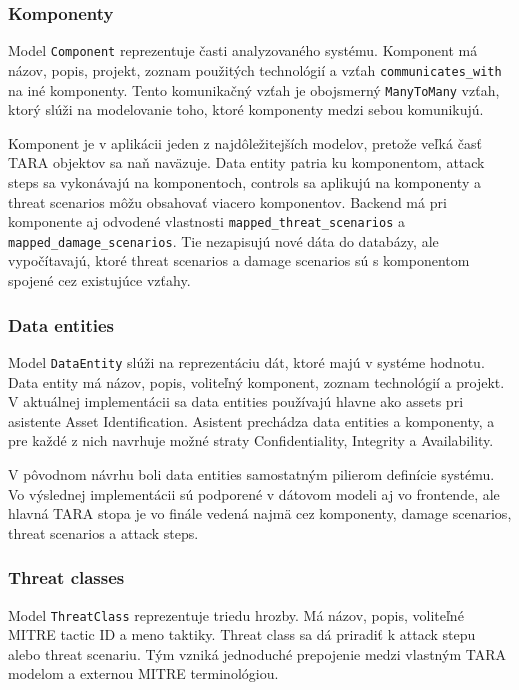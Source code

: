 \documentclass[11pt]{article}
\begin{document}
\subsubsection{Komponenty}

Model \texttt{Component} reprezentuje časti analyzovaného systému. Komponent má názov, popis, projekt, zoznam použitých technológií a vzťah \texttt{communicates\_with} na iné komponenty. Tento komunikačný vzťah je obojsmerný \texttt{ManyToMany} vzťah, ktorý slúži na modelovanie toho, ktoré komponenty medzi sebou komunikujú.

Komponent je v aplikácii jeden z najdôležitejších modelov, pretože veľká časť TARA objektov sa naň naväzuje. Data entity patria ku komponentom, attack steps sa vykonávajú na komponentoch, controls sa aplikujú na komponenty a threat scenarios môžu obsahovať viacero komponentov. Backend má pri komponente aj odvodené vlastnosti \texttt{mapped\_threat\_scenarios} a \texttt{mapped\_damage\_scenarios}. Tie nezapisujú nové dáta do databázy, ale vypočítavajú, ktoré threat scenarios a damage scenarios sú s komponentom spojené cez existujúce vzťahy.

\subsubsection{Data entities}

Model \texttt{DataEntity} slúži na reprezentáciu dát, ktoré majú v systéme hodnotu. Data entity má názov, popis, voliteľný komponent, zoznam technológií a projekt. V aktuálnej implementácii sa data entities používajú hlavne ako assets pri asistente Asset Identification. Asistent prechádza data entities a komponenty, a pre každé z nich navrhuje možné straty Confidentiality, Integrity a Availability.

V pôvodnom návrhu boli data entities samostatným pilierom definície systému. Vo výslednej implementácii sú podporené v dátovom modeli aj vo frontende, ale hlavná TARA stopa je vo finále vedená najmä cez komponenty, damage scenarios, threat scenarios a attack steps.

\subsubsection{Threat classes}

Model \texttt{ThreatClass} reprezentuje triedu hrozby. Má názov, popis, voliteľné MITRE tactic ID a meno taktiky. Threat class sa dá priradiť k attack stepu alebo threat scenariu. Tým vzniká jednoduché prepojenie medzi vlastným TARA modelom a externou MITRE terminológiou.
\end{document}
